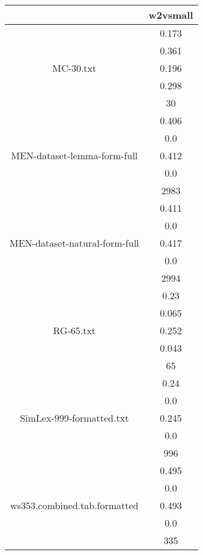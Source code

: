 \documentclass{article}
\begin{document}
\begin{tabular}{cc|}\cline{2-2}
&\multicolumn{1}{|c|}{w2vsmall} \\\hline
\multicolumn{1}{|c|}{\multirow{5}{*}{MC-30.txt}} & 0.173 \\
\multicolumn{1}{|c|}{} & 0.361 \\
\multicolumn{1}{|c|}{} & 0.196 \\
\multicolumn{1}{|c|}{} & 0.298 \\
\multicolumn{1}{|c|}{} & 30 \\
\hline
\multicolumn{1}{|c|}{\multirow{5}{*}{MEN-dataset-lemma-form-full}} & 0.406 \\
\multicolumn{1}{|c|}{} & 0.0 \\
\multicolumn{1}{|c|}{} & 0.412 \\
\multicolumn{1}{|c|}{} & 0.0 \\
\multicolumn{1}{|c|}{} & 2983 \\
\hline
\multicolumn{1}{|c|}{\multirow{5}{*}{MEN-dataset-natural-form-full}} & 0.411 \\
\multicolumn{1}{|c|}{} & 0.0 \\
\multicolumn{1}{|c|}{} & 0.417 \\
\multicolumn{1}{|c|}{} & 0.0 \\
\multicolumn{1}{|c|}{} & 2994 \\
\hline
\multicolumn{1}{|c|}{\multirow{5}{*}{RG-65.txt}} & 0.23 \\
\multicolumn{1}{|c|}{} & 0.065 \\
\multicolumn{1}{|c|}{} & 0.252 \\
\multicolumn{1}{|c|}{} & 0.043 \\
\multicolumn{1}{|c|}{} & 65 \\
\hline
\multicolumn{1}{|c|}{\multirow{5}{*}{SimLex-999-formatted.txt}} & 0.24 \\
\multicolumn{1}{|c|}{} & 0.0 \\
\multicolumn{1}{|c|}{} & 0.245 \\
\multicolumn{1}{|c|}{} & 0.0 \\
\multicolumn{1}{|c|}{} & 996 \\
\hline
\multicolumn{1}{|c|}{\multirow{5}{*}{ws353.combined.tab.formatted}} & 0.495 \\
\multicolumn{1}{|c|}{} & 0.0 \\
\multicolumn{1}{|c|}{} & 0.493 \\
\multicolumn{1}{|c|}{} & 0.0 \\
\multicolumn{1}{|c|}{} & 335 \\
\hline
\end{tabular}\\
\end{document}
